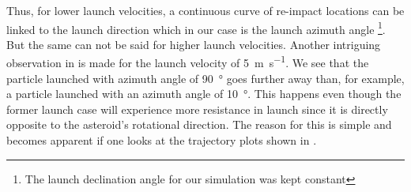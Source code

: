 \FloatBarrier
Thus, for lower launch velocities, a continuous curve of re-impact locations can be linked to the launch direction which in our case is the launch azimuth angle \footnote{The launch declination angle for our simulation was kept constant}. But the same can not be said for higher launch velocities. Another intriguing observation in  is made for the launch velocity of \SI{5}{\metre\per\second}. We see that the particle launched with azimuth angle of \SI{90}{\degree} goes further away than, for example, a particle launched with an azimuth angle of \SI{10}{\degree}. This happens even though the former launch case will experience more resistance in launch since it is directly opposite to the asteroid's rotational direction. The reason for this is simple and becomes apparent if one looks at the trajectory plots shown in .

